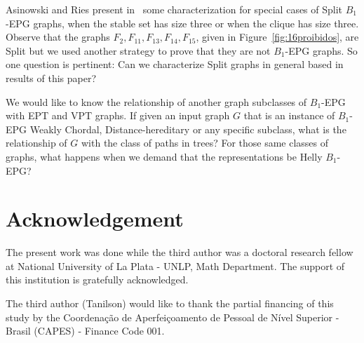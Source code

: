 \documentclass[9pt]{entcs}
\begin{document}
Asinowski and Ries present in~\cite{ries2009} some characterization for special cases of Split $B_1$-EPG graphs, when the stable set has size three or when the clique has size three. Observe that the graphs $F_2, F_{11}, F_{13}, F_{14}, F_{15}$, given in Figure~\ref{fig:16proibidos}, are Split but we used another strategy to prove that they are not $B_1$-EPG graphs. So one question is pertinent: Can we characterize Split graphs in general based in results of this paper? 

We would like to know the relationship of another graph subclasses of $B_1$-EPG with EPT and VPT graphs. If given an  input graph $G$ that is an instance of $B_1$-EPG  Weakly Chordal,  Distance-hereditary or any specific subclass, what is the relationship of $G$ with the class of paths in trees? For those same classes of graphs, what happens when we demand that the representations be Helly $B_1$-EPG?


 
%


\section*{Acknowledgement}

The present work was done while the third author was a doctoral research fellow at National University of La Plata - UNLP, Math Department. The support of this institution is gratefully acknowledged.

The third author (Tanilson) would like to thank the partial financing of this study by the Coordena{\c c}\~ao de Aperfei{\c c}oamento de Pessoal de N\'ivel Superior - Brasil (CAPES) - Finance Code 001.

\newcommand{\newblock}{} %

\end{document}
